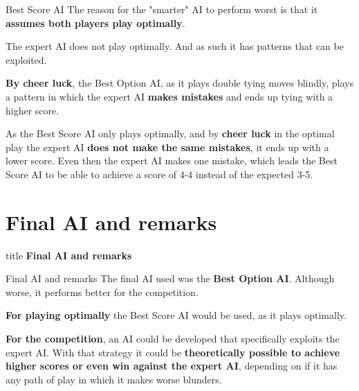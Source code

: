 \documentclass[11pt]{beamer}
\begin{document}
\begin{frame}{Best Score AI}
	The reason for the "smarter" AI to perform worst is that it \textbf{assumes both players
	play optimally}.

	\bigskip

	The expert AI does not play optimally. And as such it has patterns that can be exploited.

	\bigskip

	\textbf{By cheer luck}, the Best Option AI, as it plays double tying moves blindly, plays a pattern
	in which the expert AI \textbf{makes mistakes} and ends up tying with a higher score.

	\bigskip

	As the Best Score AI only plays optimally, and by \textbf{cheer luck} in the optimal play the expert
	AI \textbf{does not make the same mistakes}, it ends up with a lower score. Even then the expert AI makes one mistake,
	which leads the Best Score AI to be able to achieve a score of 4-4 instead of the expected 3-5.
\end{frame}

\section{Final AI and remarks}

\begin{frame}
    \begin{beamercolorbox}[sep=8pt,center,rounded=true,shadow=true]{title}
		\Huge\textbf{Final AI and remarks}
    \end{beamercolorbox}
\end{frame}

\begin{frame}{Final AI and remarks}
	The final AI used was the \textbf{Best Option AI}. Although worse, it performs better for the competition.

	\bigskip

	\textbf{For playing optimally} the Best Score AI would be used, as it plays optimally.

	\bigskip

	\textbf{For the competition}, an AI could be developed that specifically exploits the expert AI.
	With that strategy it could be \textbf{theoretically possible to achieve higher scores or even win against
	the expert AI}, depending on if it has any path of play in which it makes worse blunders.
\end{frame}
\end{document}
